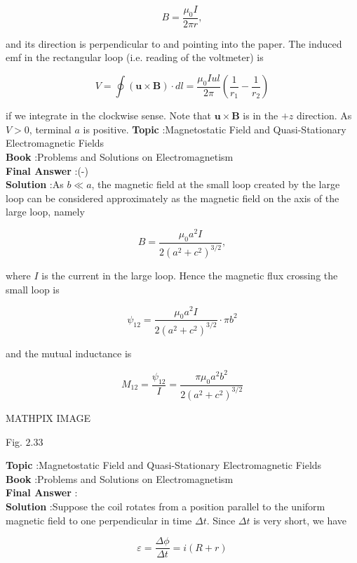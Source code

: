 \documentclass[10pt]{article}
\begin{document}
$$
B=\frac{\mu_{0} I}{2 \pi r},
$$

and its direction is perpendicular to and pointing into the paper. The induced emf in the rectangular loop (i.e. reading of the voltmeter) is

$$
V=\oint(\mathbf{u} \times \mathbf{B}) \cdot d l=\frac{\mu_{0} I u l}{2 \pi}\left(\frac{1}{r_{1}}-\frac{1}{r_{2}}\right)
$$

if we integrate in the clockwise sense. Note that $\mathbf{u} \times \mathbf{B}$ is in the $+z$ direction. As $V>0$, terminal $a$ is positive. 
\textbf{Topic} :Magnetostatic Field and Quasi-Stationary Electromagnetic Fields\\
\textbf{Book} :Problems and Solutions on Electromagnetism\\
\textbf{Final Answer} :\left(-\right)\\


\textbf{Solution} :As $b \ll a$, the magnetic field at the small loop created by the large loop can be considered approximately as the magnetic field on the axis of the large loop, namely

$$
B=\frac{\mu_{0} a^{2} I}{2\left(a^{2}+c^{2}\right)^{3 / 2}},
$$

where $I$ is the current in the large loop. Hence the magnetic flux crossing the small loop is

$$
\psi_{12}=\frac{\mu_{0} a^{2} I}{2\left(a^{2}+c^{2}\right)^{3 / 2}} \cdot \pi b^{2}
$$

and the mutual inductance is

$$
M_{12}=\frac{\psi_{12}}{I}=\frac{\pi \mu_{0} a^{2} b^{2}}{2\left(a^{2}+c^{2}\right)^{3 / 2}}
$$

MATHPIX IMAGE

Fig. $2.33$

\textbf{Topic} :Magnetostatic Field and Quasi-Stationary Electromagnetic Fields\\
\textbf{Book} :Problems and Solutions on Electromagnetism\\
\textbf{Final Answer} :\\


\textbf{Solution} :Suppose the coil rotates from a position parallel to the uniform magnetic field to one perpendicular in time $\Delta t$. Since $\Delta t$ is very short, we have

$$
\varepsilon=\frac{\Delta \phi}{\Delta t}=i(R+r)
$$
\end{document}
